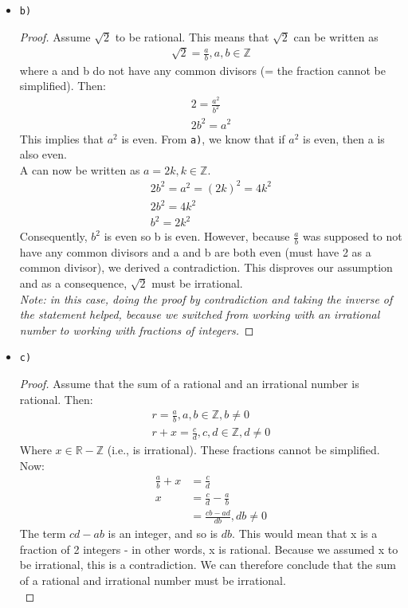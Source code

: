 \begin{solutions}
\begin{itemize}
	\item \verb|b)|
	\begin{proof}
		Assume $\sqrt{2}$ to be rational. This means that $\sqrt{2}$ can be written as 
		\begin{align*}
			\sqrt{2} = \frac{a}{b}, a, b \in \mathbb{Z}
		\end{align*}
		where a and b do not have any common divisors (= the fraction cannot be simplified). Then:
		\begin{align}
			2 = \frac{a^2}{b^2}\\
			2b^2 = a^2
		\end{align}
		This implies that $a^2$ is even. From \verb|a)|, we know that if $a^2$ is even, then a is also even.\\
		A can now be written as $a = 2k, k \in \mathbb{Z}$.
		\begin{align}
			2b^2 = a^2 = (2k)^2 = 4k^2\\
			2b^2 = 4k^2\\
			b^2 = 2k^2
		\end{align}
		Consequently, $b^2$ is even so b is even. However, because $\frac{a}{b}$ was supposed to not have any common divisors and a and b are both even (must have 2 as a common divisor), we derived a contradiction. This disproves our assumption and as a consequence, $\sqrt{2}$ must be irrational.\\
		
		\emph{Note: in this case, doing the proof by contradiction and taking the inverse of the statement helped, because we switched from working with an irrational number to working with fractions of integers.}
	\end{proof}

	\item \verb|c)|
	\begin{proof}
		Assume that the sum of a rational and an irrational number is rational. Then:
		\begin{align}
			r = \frac{a}{b}, a, b \in \mathbb{Z}, b \ne 0\\
			r + x = \frac{c}{d}, c, d \in \mathbb{Z}, d \ne 0
		\end{align}
		Where $x \in \mathbb{R} - \mathbb{Z}$ (i.e., is irrational).
		These fractions cannot be simplified. Now:
		\begin{align}
			\frac{a}{b} + x &= \frac{c}{d}\\
			x &= \frac{c}{d} - \frac{a}{b}\\
			&= \frac{cb - ad}{db}, db \ne 0
		\end{align}
		The term $cd - ab$ is an integer, and so is $db$. This would mean that x is a fraction of 2 integers - in other words, x is rational. Because we assumed x to be irrational, this is a contradiction. We can therefore conclude that the sum of a rational and irrational number must be irrational.\\
		

\end{proof}
\end{itemize}
\end{solutions}
